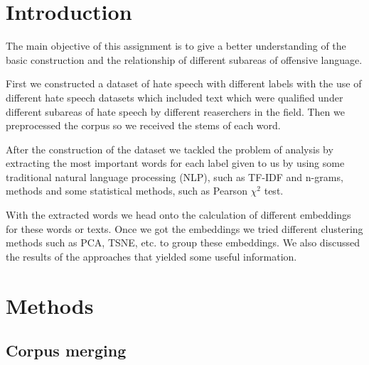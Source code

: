 \documentclass[fleqn,moreauthors,10pt]{ds_report}
\affiliation{\textit{Advisors: Slavko Žitnik}}
\begin{document}
\flushbottom 

\maketitle 

\thispagestyle{empty} 


\section*{Introduction}
The main objective of this assignment is to give a better understanding of the basic construction and the relationship of different subareas of offensive language.

First we constructed a dataset of hate speech with different labels with the use of different hate speech datasets which included text which were qualified under different subareas of hate speech by different reaserchers in the field. Then we preprocessed the corpus so we received the stems of each word.

After the construction of the dataset we tackled the problem of analysis by extracting the most important words for each label given to us by using some traditional natural language processing (NLP), such as TF-IDF and n-grams, methods and some statistical methods, such as Pearson $\chi^2$ test.

With the extracted words we head onto the calculation of different embeddings for these words or texts. Once we got the embeddings we tried different clustering methods such as PCA, TSNE, etc. to group these embeddings. We also discussed the results of the approaches that yielded some useful information.



\section*{Methods}

\subsection*{Corpus merging}
\end{document}
